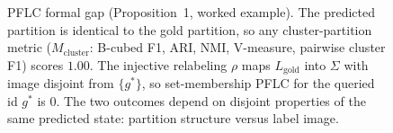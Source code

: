 \begin{figure}[t]
{\begin{tikzpicture}
\end{tikzpicture}%
}
\caption{PFLC formal gap (Proposition~1, worked example). The predicted
  partition is identical to the gold partition, so any cluster-partition
  metric ($M_{\text{cluster}}$: B-cubed F1, ARI, NMI, V-measure, pairwise
  cluster F1) scores $1.00$. The injective relabeling $\rho$ maps
  $L_{\text{gold}}$ into $\Sigma$ with image disjoint from $\{g^{*}\}$, so
  set-membership PFLC for the queried id $g^{*}$ is $0$. The two outcomes
  depend on disjoint properties of the same predicted state: partition
  structure versus label image.}
\label{fig:pflc-gap}
\end{figure}
